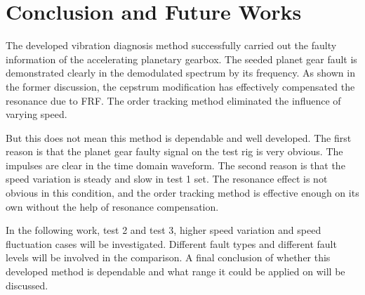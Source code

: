 \chapter{Conclusion and Future Works}\label{ch:conclusion}

The developed vibration diagnosis method successfully carried out the faulty information of the accelerating planetary gearbox. The seeded planet gear fault is demonstrated clearly in the demodulated spectrum by its frequency. As shown in the former discussion, the cepstrum modification has effectively compensated the resonance due to FRF. The order tracking method eliminated the influence of varying speed.

But this does not mean this method is dependable and well developed. The first reason is that the planet gear faulty signal on the test rig is very obvious. The impulses are clear in the time domain waveform. The second reason is that the speed variation is steady and slow in test 1 set. The resonance effect is not obvious in this condition, and the order tracking method is effective enough on its own without the help of resonance compensation. 

In the following work, test 2 and test 3, higher speed variation and speed fluctuation cases will be investigated. Different fault types and different fault levels will be involved in the comparison. A final conclusion of whether this developed method is dependable and what range it could be applied on will be discussed. 




